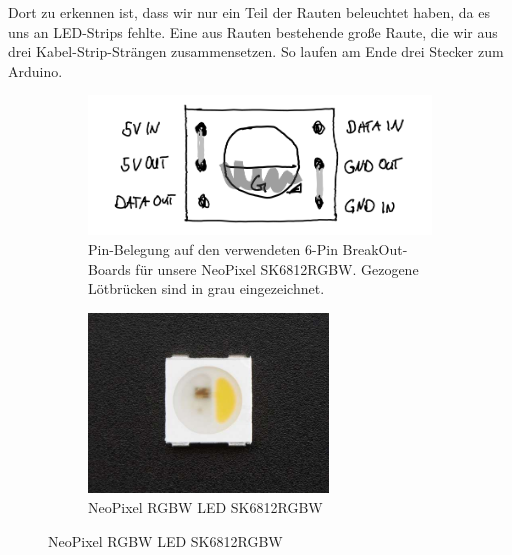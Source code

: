             Dort zu erkennen ist, dass wir nur ein Teil der Rauten beleuchtet haben, da es uns an LED-Strips fehlte. Eine aus Rauten bestehende große Raute, die wir aus drei Kabel-Strip-Strängen zusammensetzen.
            So laufen am Ende drei Stecker zum Arduino.\\

            \begin{figure}[H]
                \begin{subfigure}[b]{0.5\textwidth}
                    \centering\includegraphics[width=\textwidth]{media/03_technical_implementation/leds_2.png}
                    \caption{Pin-Belegung auf den verwendeten 6-Pin BreakOut-Boards für unsere NeoPixel SK6812RGBW. Gezogene Lötbrücken sind in grau eingezeichnet.}
                    \label{fig:pins_neopixel}
                  \end{subfigure}\quad
                  \begin{subfigure}[b]{0.5\textwidth}
                    \centering\includegraphics[width=0.7\textwidth]{media/03_technical_implementation/picture_neopixel.jpg}
                    \caption{NeoPixel RGBW LED SK6812RGBW}
                    \label{fig:picture_neopixel}
                  \end{subfigure}
            \end{figure}

